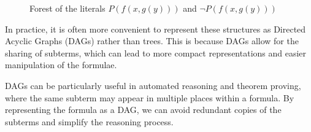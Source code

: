 \begin{figure}[H]
    \centering
    \begin{minipage}[t]{0.48\textwidth}
        \centering
    \end{minipage}
    \hfill
    \begin{minipage}[t]{0.48\textwidth}
        \centering
    \end{minipage}
    \caption{Forest of the literals \(P(f(x, g(y)))\) and \(\neg P(f(x, g(y)))\)}\label{fig:subterm_forest}
\end{figure}


In practice, it is often more convenient to represent these structures as Directed Acyclic Graphs (DAGs) rather than trees. This is because DAGs allow for the sharing of subterms, which can lead to more compact representations and easier manipulation of the formulae.

DAGs can be particularly useful in automated reasoning and theorem proving, where the same subterm may appear in multiple places within a formula. By representing the formula as a DAG, we can avoid redundant copies of the subterms and simplify the reasoning process.

